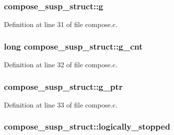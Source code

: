 \subsubsection[{\texorpdfstring{g}{g}}]{ compose\+\_\+susp\+\_\+struct\+::g}\hypertarget{structcompose__susp__struct_a2ec68b798c6128b551a843b2186a69d5}{}\label{structcompose__susp__struct_a2ec68b798c6128b551a843b2186a69d5}


Definition at line 31 of file compose.\+c.

\subsubsection[{\texorpdfstring{g\+\_\+cnt}{g_cnt}}]{\setlength{\rightskip}{0pt plus 5cm}long compose\+\_\+susp\+\_\+struct\+::g\+\_\+cnt}\hypertarget{structcompose__susp__struct_a09c4ba1cc1c8f9edbb70de6d32448f30}{}\label{structcompose__susp__struct_a09c4ba1cc1c8f9edbb70de6d32448f30}


Definition at line 32 of file compose.\+c.

\subsubsection[{\texorpdfstring{g\+\_\+ptr}{g_ptr}}]{ compose\+\_\+susp\+\_\+struct\+::g\+\_\+ptr}\hypertarget{structcompose__susp__struct_a2350356afc0eb2dfce02be8b93d672e1}{}\label{structcompose__susp__struct_a2350356afc0eb2dfce02be8b93d672e1}


Definition at line 33 of file compose.\+c.

\subsubsection[{\texorpdfstring{logically\+\_\+stopped}{logically_stopped}}]{ compose\+\_\+susp\+\_\+struct\+::logically\+\_\+stopped}\hypertarget{structcompose__susp__struct_a5440fefae91c4b0a395e9c7203b5bbfa}{}\label{structcompose__susp__struct_a5440fefae91c4b0a395e9c7203b5bbfa}


